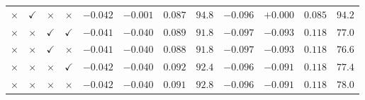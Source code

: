\begin{table}
{\begin{tabular}{cccc rrrr rrrr}
  $\times$     & $\checkmark$ & $\times$     & $\times$     & $-0.042$ & $-0.001$ & $0.087$ & $94.8$ & $-0.096$ & $+0.000$ & $0.085$ & $94.2$ \\
  $\times$     & $\times$     & $\checkmark$ & $\checkmark$ & $-0.041$ & $-0.040$ & $0.089$ & $91.8$ & $-0.097$ & $-0.093$ & $0.118$ & $77.0$ \\
  $\times$     & $\times$     & $\checkmark$ & $\times$     & $-0.041$ & $-0.040$ & $0.088$ & $91.8$ & $-0.097$ & $-0.093$ & $0.118$ & $76.6$ \\
  $\times$     & $\times$     & $\times$     & $\checkmark$ & $-0.042$ & $-0.040$ & $0.092$ & $92.4$ & $-0.096$ & $-0.091$ & $0.118$ & $77.4$ \\
  $\times$     & $\times$     & $\times$     & $\times$     & $-0.042$ & $-0.040$ & $0.091$ & $92.8$ & $-0.096$ & $-0.091$ & $0.118$ & $78.0$ \\
  \bottomrule
\end{tabular}}
\end{table}


